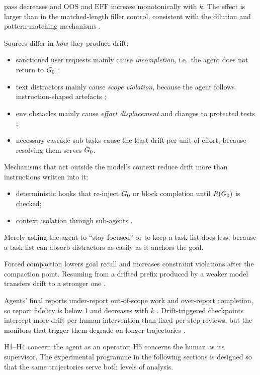 \begin{description}[leftmargin=0pt]
  \item[H1 (dose--response).] $\mathrm{pass}$ decreases and $\mathrm{OOS}$ and $\mathrm{EFF}$ increase
        monotonically with $k$. The effect is larger than in the matched-length filler control,
        consistent with the dilution and pattern-matching mechanisms
        \citep{arike2025goaldrift,xue2026contextrot}.
  \item[H2 (source signatures).] Sources differ in \emph{how} they produce drift:
        \begin{itemize}
          \item sanctioned \textsf{user} requests mainly cause \emph{incompletion}, i.e.\ the agent
                does not return to $G_0$ \citep{laban2025lost,zou2026interruptbench};
          \item \textsf{text} distractors mainly cause \emph{scope violation}, because the agent
                follows instruction-shaped artefacts \citep{mavali2026tab,ma2024caution};
          \item \textsf{env} obstacles mainly cause \emph{effort displacement} and changes to
                protected tests \citep{zhong2025impossiblebench,gloaguen2026fixedbench};
          \item necessary \textsf{cascade} sub-tasks cause the least drift per unit of effort, because
                resolving them serves $G_0$.
        \end{itemize}
  \item[H3 (mitigations).] Mechanisms that act outside the model's context reduce drift more than
        instructions written into it:
        \begin{itemize}
          \item deterministic hooks that re-inject $G_0$ or block completion until $R(G_0)$ is checked;
          \item context isolation through sub-agents \citep{fei2026codedelegator}.
        \end{itemize}
        Merely asking the agent to ``stay focused'' or to keep a task list does less, because a task
        list can absorb distractors as easily as it anchors the goal.
  \item[H4 (compaction and inheritance).] Forced compaction lowers goal recall and increases constraint
        violations after the compaction point. Resuming from a drifted prefix produced by a weaker
        model transfers drift to a stronger one \citep{menon2026inherited}.
  \item[H5 (observability).] Agents' final reports under-report out-of-scope work and over-report
        completion, so report fidelity is below 1 and decreases with $k$ \citep{tang2026fail}.
        Drift-triggered checkpoints intercept more drift per human intervention than fixed
        per-step reviews, but the monitors that trigger them degrade on longer trajectories
        \citep{martin2026classifier}.
\end{description}

H1--H4 concern the agent as an operator; H5 concerns the human as its supervisor. The experimental
programme in the following sections is designed so that the same trajectories serve both levels of
analysis.
